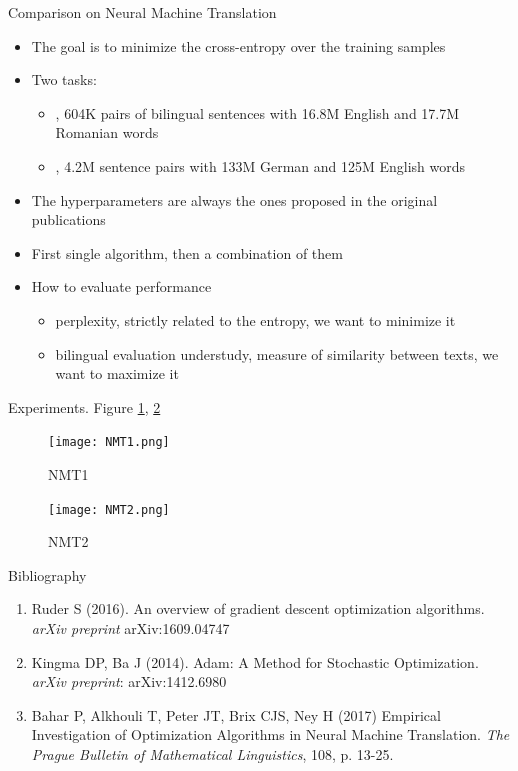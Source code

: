 \documentclass[english]{article}
\begin{document}
\item {Comparison on Neural Machine Translation}

\begin{itemize}
\item The goal is to minimize the cross-entropy over the training samples 
\item Two tasks: 
\begin{itemize}
\item {}, 604K pairs of bilingual sentences with 16.8M English and 17.7M Romanian words
\item {}, 4.2M sentence pairs with 133M German and 125M English words
\end{itemize}


\item The hyperparameters are always the ones proposed in the original publications 
\item First single algorithm, then a combination of them

\item How to evaluate performance
\begin{itemize}
\item {} perplexity, strictly related to the entropy, we want to minimize it
\item {} bilingual evaluation understudy, measure of similarity between texts, we want to maximize it
\end{itemize}
\end{itemize}

\item Experiments. Figure \ref{NMT1}, \ref{NMT2}




\begin{figure}
 \centering
\texttt{[image: NMT1.png]}
\caption{NMT1}
\label{NMT1}
\end{figure}







\begin{figure}
 \centering
\texttt{[image: NMT2.png]}
\caption{NMT2}
\label{NMT2}
\end{figure}



\item 


{Bibliography}
\begin{enumerate}
\item Ruder S (2016). An overview of gradient descent optimization algorithms. \textit{arXiv preprint} arXiv:1609.04747 
\item Kingma DP, Ba J (2014). Adam: A Method for Stochastic Optimization. \textit{arXiv preprint}:  arXiv:1412.6980 
\item Bahar P, Alkhouli T, Peter JT, Brix CJS, Ney H (2017) Empirical Investigation of Optimization Algorithms in Neural Machine Translation. \textit{The Prague Bulletin of Mathematical Linguistics}, 108, p. 13-25. 
\end{enumerate}
\end{document}
